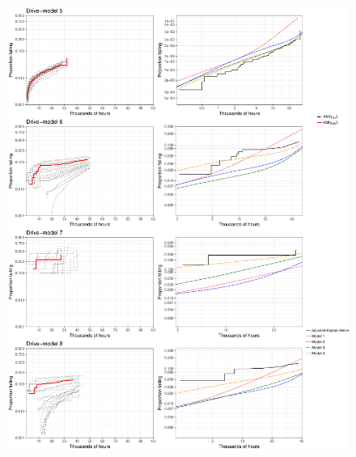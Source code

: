 \documentclass[12pt]{article}
\begin{document}
\begin{figure}[H]
\includegraphics[width=\textwidth]{ppcheck-v3-2}
\end{figure}
\end{document}
